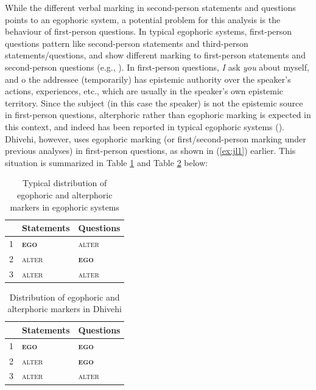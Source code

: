 \documentclass[output=paper]{langsci/langscibook}
\begin{document}
While the different verbal marking in second-person statements and questions points to an egophoric system, a potential problem for this analysis is the behaviour of first-person questions. In typical egophoric systems, first-person questions pattern like second-person statements and third-person statements/questions, and show different marking to first-person statements and second-person questions (e.g., \citealt{Hale1980}). In first-person questions, \textit{I} ask \textit{you} about myself, and o the addressee (temporarily) has epistemic authority over the speaker’s actions, experiences, etc., which are usually in the speaker’s own epistemic territory. Since the subject (in this case the speaker) is not the epistemic source in first-person questions, alterphoric rather than egophoric marking is expected in this context, and indeed has been reported in typical egophoric systems (\citealt[4--5]{SanRoque2018}). Dhivehi, however, uses egophoric marking (or first/second-person marking under previous analyses) in first-person questions, as shown in (\ref{ex:jl1}) earlier. This situation is summarized in Table \ref{tab:jl5} and Table \ref{tab:jl6} below:
 
\begin{table}
\begin{tabularx}{.5\textwidth}{lXX}
\hline
 & \textbf{	Statements}	& \textbf{Questions}\\
\hline
1	&	\textbf{\textsc{	ego	}}	&	\textsc{	alter	}	\\
2	&	\textsc{	alter	}	&	\textbf{\textsc{	ego	}}	\\
3	&	\textsc{	alter	}	&	\textsc{	alter	}	\\
\hline
\end{tabularx}
\caption{Typical distribution of egophoric and alterphoric markers in egophoric systems}
\label{tab:jl5}	
\end{table}
 
\begin{table}
\begin{tabularx}{.5\textwidth}{lXX}
\hline
 & \textbf{	Statements}	& \textbf{Questions}\\
\hline
1	&	\textbf{\textsc{	ego	}}	&	\textbf{\textsc{	ego	}}	\\
2	&	\textsc{	alter	}	&	\textbf{\textsc{	ego	}}	\\
3	&	\textsc{	alter	}	&	\textsc{	alter	}	\\
\hline
\end{tabularx}
\caption{Distribution of egophoric and alterphoric markers in Dhivehi}
\label{tab:jl6}	
\end{table}
 
\end{document}
